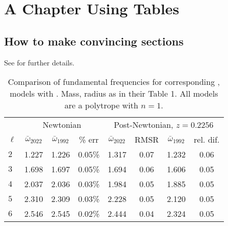 
\chapter{A Chapter Using Tables\label{ch:chapter3}}


\section{How to make convincing sections}
\lipsum[3][4-6]
See  for further details.  
\lipsum[6][3]

\begin{table}
\begin{center}
\begin{tabular}{l|ccc|cccc}
\hline\hline
	& \multicolumn{3}{c|}{Newtonian} 
	& \multicolumn{4}{c}{Post-Newtonian, $z=0.2256$}\\
$\ell$	
	& $\bar{\omega}_{2022}$ & $\bar{\omega}_\text{1992}$ & \% err 
	& $\bar{\omega}_{2022}$ & RMSR & $\bar{\omega}_\text{1992}$ & rel. dif.
	\\
	\hline
$2$ 
	& 1.227 & 1.226 & 0.05\%      %
	& 1.317 & 0.07 & 1.232 & 0.06
	\\
$3$ 
	& 1.698 & 1.697 & 0.05\%      %
	& 1.694 & 0.06 & 1.606 & 0.05
	\\
$4$ 
	& 2.037 & 2.036 & 0.03\%     %
	& 1.984 & 0.05 & 1.885 & 0.05
	\\
$5$ 
	& 2.310  & 2.309 & 0.03\%    %
	& 2.228 & 0.05 & 2.120 & 0.05
	\\
$6$ 
	& 2.546 & 2.545 & 0.02\%     %
	& 2.444 & 0.04 & 2.324 & 0.05
	\\
\hline
\end{tabular}
\end{center}
\caption[Comparison of  dipole ($l=1$)  modes to \citet{CutlLind92}]{
	Comparison of fundamental frequencies for corresponding ,  models with \citet{CutlLind92}.  
	Mass, radius as in their Table 1.
	All models are a polytrope with $n=1$.
\label{tab:chapter3:cutler}}
\end{table}

